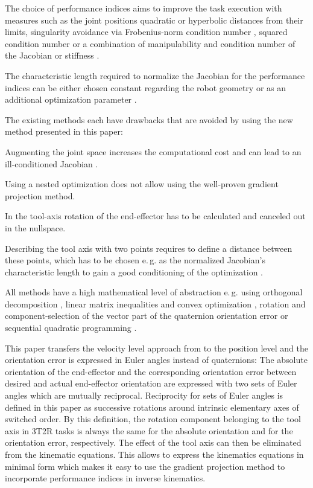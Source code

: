 \documentclass{svproc}
\begin{document}
The choice of performance indices aims to improve the task execution with measures such as the joint positions quadratic \cite{HuoBar2005} or hyperbolic \cite{ZhuQuCaoYan2013} distances from their limits, singularity avoidance via Frobenius-norm condition number \cite{ZhuQuCaoYan2013}, squared condition number \cite{LegerAng2016} or a combination of manipulability and condition number of the Jacobian \cite{HuoBar2008} or stiffness \cite{GuoDonKe2015}.

The characteristic length required to normalize the Jacobian for the performance indices can be either chosen constant regarding the robot geometry \cite{ZhuQuCaoYan2013} or as an additional optimization parameter \cite{LegerAng2016}.

The existing methods each have drawbacks that are avoided by using the new method presented in this paper:
\begin{compactitem}
    \item Augmenting the joint space \cite{Baron2000} increases the computational cost and can lead to an ill-conditioned Jacobian \cite{HuoBar2008}.
    \item Using a nested optimization \cite{ZhuQuCaoYan2013,GuoDonKe2015} does not allow using the well-proven gradient projection method.
    \item In \cite{Zlajpah2017} the tool-axis rotation of the end-effector has to be calculated and canceled out in the nullspace.
    \item Describing the tool axis with two points requires to define a distance between these points, which has to be chosen e.\,g. as the normalized Jacobian's characteristic length to gain a good conditioning of the optimization \cite{LegerAng2016}.
    \item All methods have a high mathematical level of abstraction e.\,g. using orthogonal decomposition \cite{HuoBar2008}, linear matrix inequalities and convex optimization \cite{FromGra2010}, rotation and component-selection of the vector part of the quaternion orientation error \cite{Zlajpah2017} or sequential quadratic programming \cite{LegerAng2016}.
\end{compactitem}

This paper transfers the velocity level approach from \cite{Zlajpah2017} to the position level and the orientation error is expressed in Euler angles instead of quaternions:
%
The absolute orientation of the end-effector and the corresponding orientation error between desired and actual end-effector orientation are expressed with two sets of Euler angles which are mutually reciprocal.
Reciprocity for sets of Euler angles is defined in this paper as successive rotations around intrinsic elementary axes of switched order.
By this definition, the rotation component belonging to the tool axis in 3T2R tasks is always the same for the absolute orientation and for the orientation error, respectively.
The effect of the tool axis can then be eliminated from the kinematic equations.
This allows to express the kinematics equations in minimal form which makes it easy to use the gradient projection method to incorporate performance indices in inverse kinematics.
\end{document}
